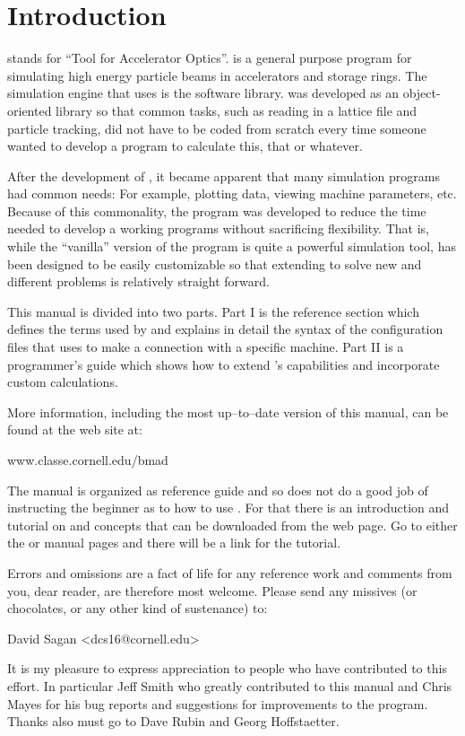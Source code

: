 \section*{Introduction}
\label{c:introduction}

\tao stands for ``Tool for Accelerator Optics''. \tao is a general purpose program for simulating
high energy particle beams in accelerators and storage rings. The simulation engine that \tao uses
is the \bmad software library\cite{b:bmad}. \bmad was developed as an object-oriented library so
that common tasks, such as reading in a lattice file and particle tracking, did not have to be coded
from scratch every time someone wanted to develop a program to calculate this, that or whatever.

After the development of \bmad, it became apparent that many simulation programs had common needs:
For example, plotting data, viewing machine parameters, etc. Because of this commonality, the \tao
program was developed to reduce the time needed to develop a working programs without sacrificing
flexibility. That is, while the ``vanilla'' version of the \tao program is quite a powerful
simulation tool, \tao has been designed to be easily customizable so that extending \tao to solve
new and different problems is relatively straight forward.

This manual is divided into two parts. Part I is the reference section which defines the terms used
by \tao and explains in detail the syntax of the configuration files that \tao uses to make a
connection with a specific machine. Part II is a programmer's guide which shows how to extend
\tao's capabilities and incorporate custom calculations.

More information, including the most up--to--date version of this
manual, can be found at the \bmad web site at:
\begin{example}
  www.classe.cornell.edu/bmad
\end{example}

\vspace{0.1in}
The \tao manual is organized as reference guide and so does not do a good job of instructing the
beginner as to how to use \tao. For that there is an introduction and tutorial on \bmad and \tao
concepts that can be downloaded from the \bmad web page. Go to either the \bmad or \tao manual pages
and there will be a link for the tutorial.

Errors and omissions are a fact of life for any reference work and comments from you, dear reader,
are therefore most welcome. Please send any missives (or chocolates, or any other kind of
sustenance) to:
\begin{example}
  David Sagan <dcs16@cornell.edu>
\end{example}

It is my pleasure to express appreciation to people who have contributed to this effort. In
particular Jeff Smith who greatly contributed to this manual and Chris Mayes for his bug reports and
suggestions for improvements to the program. Thanks also must go to Dave Rubin and Georg
Hoffstaetter.
